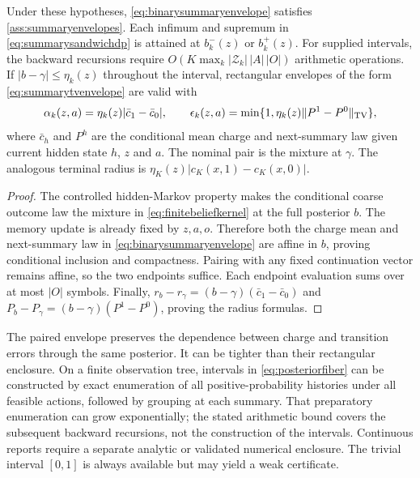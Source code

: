 \begin{proposition}
\label{prop:binarysummary}
Under these hypotheses, \eqref{eq:binarysummaryenvelope} satisfies
\cref{ass:summaryenvelopes}. Each infimum and supremum in
\eqref{eq:summarysandwichdp} is attained at $b_k^-(z)$ or $b_k^+(z)$.
For supplied intervals, the backward recursions require
$O(K\max_k|\mathcal Z_k|\,|A|\,|O|)$ arithmetic operations.
If $|b-\gamma|\le\eta_k(z)$ throughout the interval, rectangular
envelopes of the form \eqref{eq:summarytvenvelope} are valid with
\begin{equation}\label{eq:binarysummaryradius}
 \alpha_k(z,a)=\eta_k(z)|\bar c_1-\bar c_0|,\qquad
 \epsilon_k(z,a)=\min\{1,\eta_k(z)\|P^1-P^0\|_{\operatorname{TV}}\},
\end{equation}
where $\bar c_h$ and $P^h$ are the conditional mean charge and next-summary
law given current hidden state $h$, $z$ and $a$. The nominal pair is the
mixture at $\gamma$. The analogous terminal radius is
$\eta_K(z)|c_K(x,1)-c_K(x,0)|$.
\end{proposition}
\begin{proof}
The controlled hidden-Markov property makes the conditional coarse outcome
law the mixture in \eqref{eq:finitebeliefkernel} at the full posterior $b$.
The memory update is already fixed by $z,a,o$. Therefore both the charge
mean and next-summary law in \eqref{eq:binarysummaryenvelope} are affine
in $b$, proving conditional inclusion and compactness. Pairing with any
fixed continuation vector remains affine, so the two endpoints suffice.
Each endpoint evaluation sums over at most $|O|$ symbols. Finally,
$r_b-r_\gamma=(b-\gamma)(\bar c_1-\bar c_0)$ and
$P_b-P_\gamma=(b-\gamma)(P^1-P^0)$, proving the radius formulas.
\end{proof}

The paired envelope preserves the dependence between charge and transition
errors through the same posterior. It can be tighter than their rectangular
enclosure. On a finite observation tree, intervals in
\eqref{eq:posteriorfiber} can be constructed by exact enumeration of all
positive-probability histories under all feasible actions, followed by
grouping at each summary. That preparatory enumeration can grow
exponentially; the stated arithmetic bound covers the subsequent backward
recursions, not the construction of the intervals. Continuous reports require
a separate analytic or validated numerical enclosure. The trivial interval
$[0,1]$ is always available but may yield a weak certificate.

